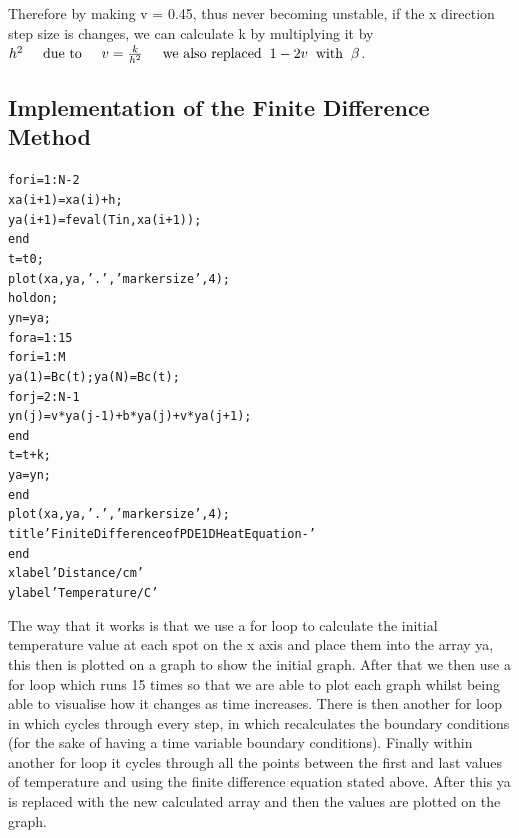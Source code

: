 \documentclass[11pt,a4paper]{article}
\begin{document}
Therefore by making v = 0.45, thus never becoming unstable, if the x direction step size is changes, we can calculate k by multiplying it by $h^2 \hspace{5mm} \text{due to} \hspace{5mm} v = \frac{k}{h^2} \hspace{5mm} \text{we also replaced} \hspace{2mm} 1-2v \hspace{2mm} \text{with} \hspace{2mm} \beta $.

\subsection{Implementation of the Finite Difference Method}

\begin{alltt}
for i = 1:N-2
    xa(i+1) = xa(i) + h; %
    ya(i+1) = feval(Tin, xa(i+1)); %
end
t = t0; %
plot(xa, ya, '.', 'markersize', 4); %
hold on; %
yn = ya; %
for a = 1:15 %
    for i = 1:M %
        ya(1) = Bc(t); ya(N) = Bc(t); %
	       for j = 2:N-1 %
           yn(j) = v*ya(j-1) + b*ya(j) + v*ya(j+1);
	       end
        t = t+k; %
        ya = yn; %
    end
    plot(xa, ya, '.', 'markersize', 4); %
    title 'Finite Difference of PDE 1D Heat Equation - '
end
xlabel 'Distance/cm'
ylabel 'Temperature/C'
\end{alltt}

The way that it works is that we use a for loop to calculate the initial temperature value at each spot on the x axis and place them into the array ya, this then is plotted on a graph to show the initial graph. After that we then use a for loop which runs 15 times so that we are able to plot each graph whilst being able to visualise how it changes as time increases. There is then another for loop in which cycles through every step, in which recalculates the boundary conditions (for the sake of having a time variable boundary conditions). Finally within another for loop it cycles through all the points between the first and last values of temperature and using the finite difference equation stated above. After this ya is replaced with the new calculated array and then the values are plotted on the graph.
\end{document}

